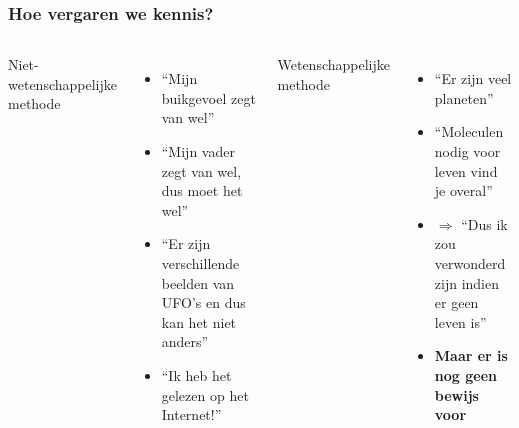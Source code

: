 \documentclass[aspectratio=169]{beamer}
\begin{document}
\begin{frame}
  \frametitle{Hoe vergaren we kennis?}

  \begin{columns}[c]

  Niet-wetenschappelijke methode
    \begin{itemize}
    \item ``Mijn buikgevoel zegt van wel''
    \item ``Mijn vader zegt van wel, dus moet het wel''
    \item ``Er zijn verschillende beelden van UFO's en dus kan het niet anders''
    \item ``Ik heb het gelezen op het Internet!''
    \end{itemize}

  \pause

  Wetenschappelijke methode
    \begin{itemize}
    \item ``Er zijn veel planeten''
    \item ``Moleculen nodig voor leven vind je overal''
    \item $\Rightarrow$ ``Dus ik zou verwonderd zijn indien er geen leven is''
    \item \textbf{Maar er is nog geen bewijs voor}
    \end{itemize}

  \end{columns}
\end{frame}
\end{document}
